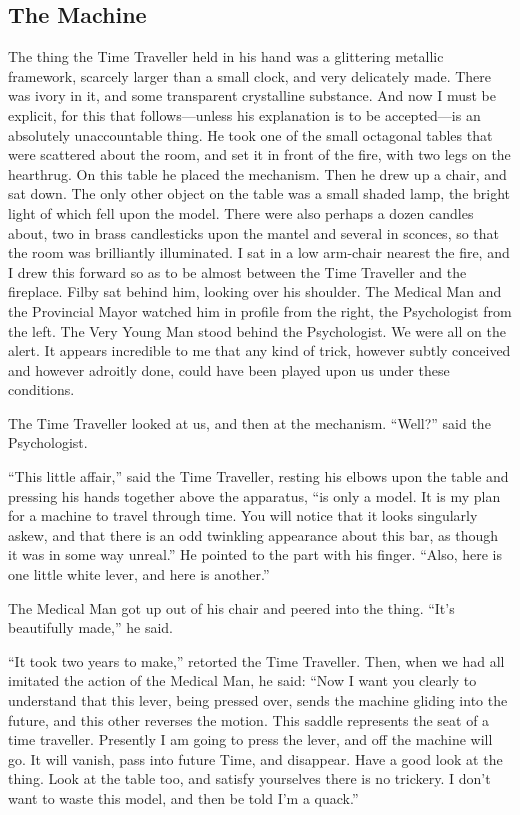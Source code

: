 \documentclass[../book]{subfiles}
\begin{document}
\begin{markdown}


\chapter{The Machine}


The thing the Time Traveller held in his hand was a glittering metallic framework, scarcely larger than a small clock, and very delicately made. There was ivory in it, and some transparent crystalline substance. And now I must be explicit, for this that follows—unless his explanation is to be accepted—is an absolutely unaccountable thing. He took one of the small octagonal tables that were scattered about the room, and set it in front of the fire, with two legs on the hearthrug. On this table he placed the mechanism. Then he drew up a chair, and sat down. The only other object on the table was a small shaded lamp, the bright light of which fell upon the model. There were also perhaps a dozen candles about, two in brass candlesticks upon the mantel and several in sconces, so that the room was brilliantly illuminated. I sat in a low arm-chair nearest the fire, and I drew this forward so as to be almost between the Time Traveller and the fireplace. Filby sat behind him, looking over his shoulder. The Medical Man and the Provincial Mayor watched him in profile from the right, the Psychologist from the left. The Very Young Man stood behind the Psychologist. We were all on the alert. It appears incredible to me that any kind of trick, however subtly conceived and however adroitly done, could have been played upon us under these conditions.

The Time Traveller looked at us, and then at the mechanism. “Well?” said the Psychologist.

“This little affair,” said the Time Traveller, resting his elbows upon the table and pressing his hands together above the apparatus, “is only a model. It is my plan for a machine to travel through time. You will notice that it looks singularly askew, and that there is an odd twinkling appearance about this bar, as though it was in some way unreal.” He pointed to the part with his finger. “Also, here is one little white lever, and here is another.”

The Medical Man got up out of his chair and peered into the thing. “It’s beautifully made,” he said.

“It took two years to make,” retorted the Time Traveller. Then, when we had all imitated the action of the Medical Man, he said: “Now I want you clearly to understand that this lever, being pressed over, sends the machine gliding into the future, and this other reverses the motion. This saddle represents the seat of a time traveller. Presently I am going to press the lever, and off the machine will go. It will vanish, pass into future Time, and disappear. Have a good look at the thing. Look at the table too, and satisfy yourselves there is no trickery. I don’t want to waste this model, and then be told I’m a quack.”


\end{markdown}
\end{document}
